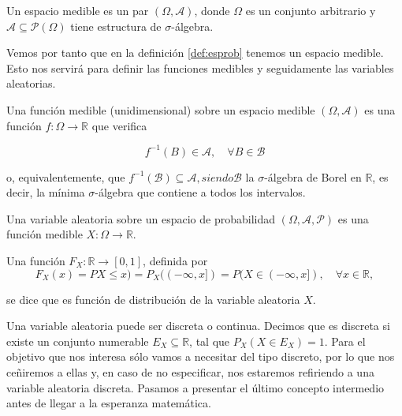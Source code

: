 \begin{definicion}
	Un espacio medible es un par $(\Omega, \mathcal{A})$, donde $\Omega$ es un conjunto arbitrario y $\mathcal{A} \subseteq \mathcal{P}(\Omega)$ tiene estructura de $\sigma$-álgebra.
\end{definicion}

Vemos por tanto que en la definición \ref{def:esprob} tenemos un espacio medible. Esto nos servirá para definir las funciones medibles y seguidamente las variables aleatorias.

\begin{definicion}
	Una función medible (unidimensional) sobre un espacio medible $(\Omega, \mathcal{A})$ es una función $f: \Omega \rightarrow \mathbb{R}$ que verifica

	\begin{equation*}
		f^{-1}(B) \in \mathcal{A}, \quad \forall B \in \mathcal{B}
	\end{equation*} 

	o, equivalentemente, que $f^{-1}(\mathcal{B}) \subseteq \mathcal{A}, siendo \mathcal{B}$ la $\sigma$-álgebra de Borel en $\mathbb{R}$, es decir, la mínima $\sigma$-álgebra que contiene a todos los intervalos.

\end{definicion}


\begin{definicion}
	Una variable aleatoria sobre un espacio de probabilidad $(\Omega, \mathcal{A}, \mathcal{P})$ es una función medible $X: \Omega \rightarrow \mathbb{R}$.
\end{definicion}

\begin{definicion}
	Una función $F_X:\mathbb{R} \rightarrow [0,1]$, definida por
	\begin{equation*}
		F_X(x)=PX \leq x) = P_X((- \infty , x]) = P( X \in (- \infty, x ]), \quad \forall x \in \mathbb{R},
	\end{equation*}

	se dice que es función de distribución de la variable aleatoria $X$.
\end{definicion}

Una variable aleatoria puede ser discreta o continua. Decimos que es discreta si existe un conjunto numerable $E_X \subseteq \mathbb{R}$, tal que $P_X(X \in E_X) = 1$. Para el objetivo que nos interesa sólo vamos a necesitar del tipo discreto, por lo que nos ceñiremos a ellas y, en caso de no especificar, nos estaremos refiriendo a una variable aleatoria discreta. Pasamos a presentar el último concepto intermedio antes de llegar a la esperanza matemática.

